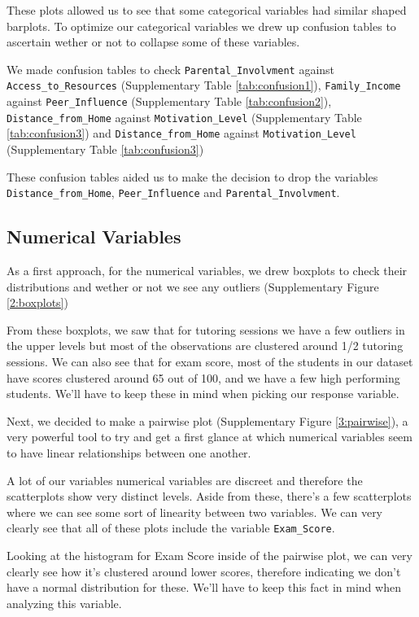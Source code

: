\documentclass[twocolumn]{article} %
\begin{document}
These plots allowed us to see that some categorical variables had similar shaped barplots. To optimize our categorical variables we drew up confusion tables to ascertain wether or not to collapse some of these variables.

We made confusion tables to check \texttt{Parental\_Involvment} against \texttt{Access\_to\_Resources} (Supplementary Table \ref{tab:confusion1}), \texttt{Family\_Income} against \texttt{Peer\_Influence} (Supplementary Table \ref{tab:confusion2}), \texttt{Distance\_from\_Home} against \texttt{Motivation\_Level} (Supplementary Table \ref{tab:confusion3}) and \texttt{Distance\_from\_Home} against \texttt{Motivation\_Level} (Supplementary Table \ref{tab:confusion3})

These confusion tables aided us to make the decision to drop the variables \texttt{Distance\_from\_Home}, \texttt{Peer\_Influence} and \texttt{Parental\_Involvment}.

\subsection*{Numerical Variables}

As a first approach, for the numerical variables, we drew boxplots to check their distributions and wether or not we see any outliers (Supplementary Figure \ref{2:boxplots})

From these boxplots, we saw that for tutoring sessions we have a few outliers in the upper levels but most of the observations are clustered around 1/2 tutoring sessions. We can also see that for exam score, most of the students in our dataset have scores clustered around 65 out of 100, and we have a few high performing students. We'll have to keep these in mind when picking our response variable.

Next, we decided to make a pairwise plot (Supplementary Figure \ref{3:pairwise}), a very powerful tool to try and get a first glance at which numerical variables seem to have linear relationships between one another.

A lot of our variables numerical variables are discreet and therefore the scatterplots show very distinct levels. Aside from these, there's a few scatterplots where we can see some sort of linearity between two variables. We can very clearly see that all of these plots include the variable \texttt{Exam\_Score}.

Looking at the histogram for Exam Score inside of the pairwise plot, we can very clearly see how it's clustered around lower scores, therefore indicating we don't have a normal distribution for these. We'll have to keep this fact in mind when analyzing this variable.
\end{document}
